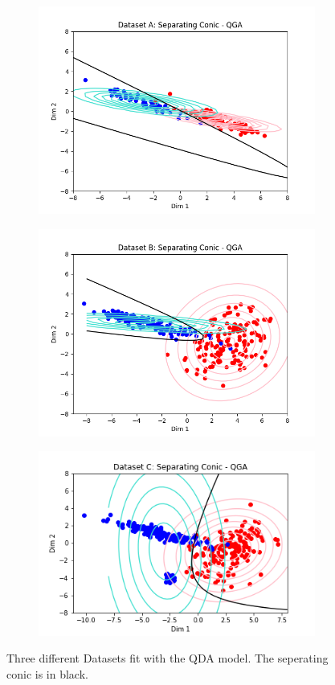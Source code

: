\documentclass[paper=a4, fontsize=11pt]{scrartcl} %
\numberwithin{equation}{section} %
\numberwithin{figure}{section} %
\numberwithin{table}{section} %
\begin{document}
\begin{figure}
	\begin{subfigure}{.5\textwidth}
		\centering
		\includegraphics[width=.9\linewidth]{img_A_MoG_dm.png}
	\end{subfigure}
	\begin{subfigure}{.5\textwidth}
		\centering
		\includegraphics[width=.9\linewidth]{img_B_MoG_dm.png}
	\end{subfigure}
	\begin{subfigure}{.5\textwidth}
		\centering
		\includegraphics[width=.9\linewidth]{img_C_MoG_dm.png}
	\end{subfigure}
	\caption{Three different Datasets fit with the QDA model. The seperating conic is in black.}
\end{figure}
\end{document}
